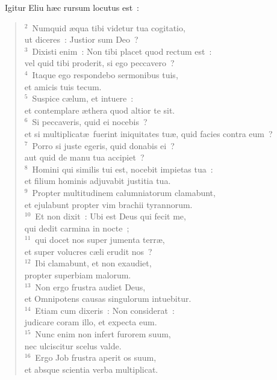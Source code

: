 ~\lettrine[lines=10,image=true,loversize=0.05,lraise=-0.03]{I}{}gitur Eliu h\ae c rursum locutus est~:
\begin{flushleft}\begin{verse}\vspace{6pt}${}^{2}$~Numquid \ae qua tibi videtur tua cogitatio,\\ ut diceres~: Justior sum Deo~?\\
${}^{3}$~Dixisti enim~: Non tibi placet quod rectum est~:\\ vel quid tibi proderit, si ego peccavero~?\\
${}^{4}$~Itaque ego respondebo sermonibus tuis,\\ et amicis tuis tecum.\\
${}^{5}$~Suspice c\ae lum, et intuere~:\\ et contemplare \ae thera quod altior te sit.\\
${}^{6}$~Si peccaveris, quid ei nocebis~?\\ et si multiplicat\ae\ fuerint iniquitates tu\ae , quid facies contra eum~?\\
${}^{7}$~Porro si juste egeris, quid donabis ei~?\\ aut quid de manu tua accipiet~?\\
${}^{8}$~Homini qui similis tui est, nocebit impietas tua~:\\ et filium hominis adjuvabit justitia tua.\\
${}^{9}$~Propter multitudinem calumniatorum clamabunt,\\ et ejulabunt propter vim brachii tyrannorum.\\
${}^{10}$~Et non dixit~: Ubi est Deus qui fecit me,\\ qui dedit carmina in nocte~;\\
${}^{11}$~qui docet nos super jumenta terr\ae ,\\ et super volucres c\ae li erudit nos~?\\
${}^{12}$~Ibi clamabunt, et non exaudiet,\\ propter superbiam malorum.\\
${}^{13}$~Non ergo frustra audiet Deus,\\ et Omnipotens causas singulorum intuebitur.\\
${}^{14}$~Etiam cum dixeris~: Non considerat~:\\ judicare coram illo, et expecta eum.\\
${}^{15}$~Nunc enim non infert furorem suum,\\ nec ulciscitur scelus valde.\\
${}^{16}$~Ergo Job frustra aperit os suum,\\ et absque scientia verba multiplicat.\end{verse}\end{flushleft}


